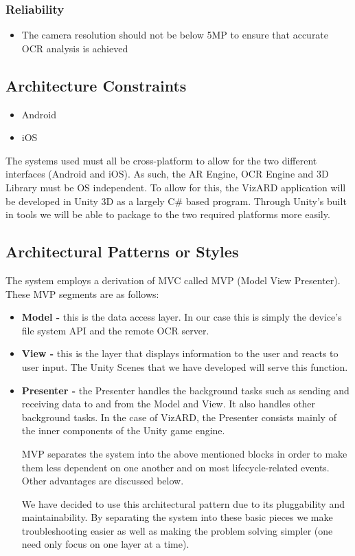 \documentclass[a4paper,12pt]{article}
\begin{document}
\subsubsection*{Reliability}	
\begin{itemize}		
	\item The camera resolution should not be below 5MP to ensure that accurate OCR analysis is achieved
\end{itemize}

\subsection{Architecture Constraints}
\begin{itemize}
	\item Android
	\item iOS
\end{itemize}
The systems used must all be cross-platform to allow for the two different interfaces (Android and iOS). As such, the AR Engine, OCR Engine and 3D Library must be OS independent.
\newline
To allow for this, the VizARD application will be developed in Unity 3D as a largely C\# based program. Through Unity's built in tools we will be able to package to the two required platforms more easily. 

\subsection{Architectural Patterns or Styles}
The system employs a derivation of MVC called MVP (Model View Presenter).
These MVP segments are as follows:
\begin{itemize}
	\item \textbf{Model -} this is the data access layer. In our case this is simply the device's file system API and the remote OCR server.
	\item\textbf{View -} this is the layer that displays information to the user and reacts to user input. The Unity Scenes that we have developed will serve this function.
	\item \textbf{Presenter -} the Presenter handles the background tasks such as sending and receiving data to and from the Model and View. It also handles other background tasks. In the case of VizARD, the Presenter consists mainly of the inner components of the Unity game engine.
	
MVP separates the system into the above mentioned blocks in order to make them less dependent on one another and on most lifecycle-related events. Other advantages are discussed below.

We have decided to use this architectural pattern due to its pluggability and maintainability. By separating the system into these basic pieces we make troubleshooting easier as well as making the problem solving simpler (one need only focus on one layer at a time).
\end{itemize}
\end{document}
